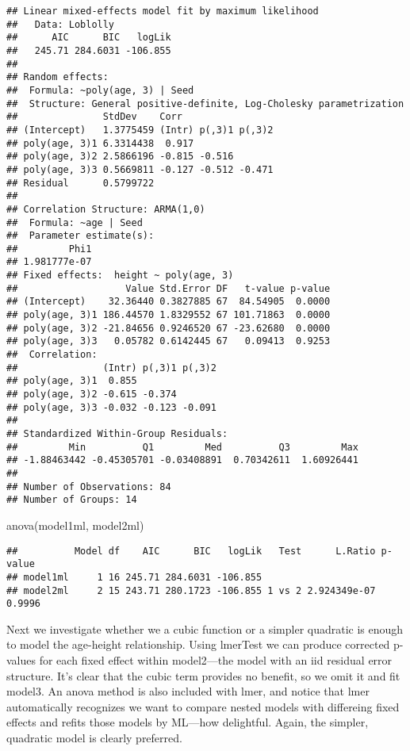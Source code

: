 \documentclass[
]{book}
\newenvironment{Shaded}{\begin{snugshade}}{\end{snugshade}}
\newcommand{\FunctionTok}[1]{\textcolor[rgb]{0.00,0.00,0.00}{#1}}
\newcommand{\NormalTok}[1]{#1}
\begin{document}
\begin{verbatim}
## Linear mixed-effects model fit by maximum likelihood
##   Data: Loblolly 
##      AIC      BIC   logLik
##   245.71 284.6031 -106.855
## 
## Random effects:
##  Formula: ~poly(age, 3) | Seed
##  Structure: General positive-definite, Log-Cholesky parametrization
##               StdDev    Corr                
## (Intercept)   1.3775459 (Intr) p(,3)1 p(,3)2
## poly(age, 3)1 6.3314438  0.917              
## poly(age, 3)2 2.5866196 -0.815 -0.516       
## poly(age, 3)3 0.5669811 -0.127 -0.512 -0.471
## Residual      0.5799722                     
## 
## Correlation Structure: ARMA(1,0)
##  Formula: ~age | Seed 
##  Parameter estimate(s):
##         Phi1 
## 1.981777e-07 
## Fixed effects:  height ~ poly(age, 3) 
##                   Value Std.Error DF   t-value p-value
## (Intercept)    32.36440 0.3827885 67  84.54905  0.0000
## poly(age, 3)1 186.44570 1.8329552 67 101.71863  0.0000
## poly(age, 3)2 -21.84656 0.9246520 67 -23.62680  0.0000
## poly(age, 3)3   0.05782 0.6142445 67   0.09413  0.9253
##  Correlation: 
##               (Intr) p(,3)1 p(,3)2
## poly(age, 3)1  0.855              
## poly(age, 3)2 -0.615 -0.374       
## poly(age, 3)3 -0.032 -0.123 -0.091
## 
## Standardized Within-Group Residuals:
##         Min          Q1         Med          Q3         Max 
## -1.88463442 -0.45305701 -0.03408891  0.70342611  1.60926441 
## 
## Number of Observations: 84
## Number of Groups: 14
\end{verbatim}

\begin{Shaded}
\begin{Highlighting}[]
\FunctionTok{anova}\NormalTok{(model1ml, model2ml)}
\end{Highlighting}
\end{Shaded}

\begin{verbatim}
##          Model df    AIC      BIC   logLik   Test      L.Ratio p-value
## model1ml     1 16 245.71 284.6031 -106.855                            
## model2ml     2 15 243.71 280.1723 -106.855 1 vs 2 2.924349e-07  0.9996
\end{verbatim}

Next we investigate whether we a cubic function or a simpler quadratic is enough to model the age-height relationship. Using lmerTest we can produce corrected p-values for each fixed effect within model2---the model with an iid residual error structure. It's clear that the cubic term provides no benefit, so we omit it and fit model3. An anova method is also included with lmer, and notice that lmer automatically recognizes we want to compare nested models with differeing fixed effects and refits those models by ML---how delightful. Again, the simpler, quadratic model is clearly preferred.
\end{document}
